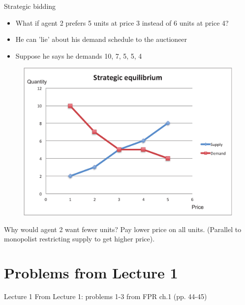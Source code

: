 \begin{frame}{Strategic bidding}
	\begin{itemize}
		\item What if agent 2 prefers 5 units at price 3 instead of 6 units at price 4?
		\item He can 'lie' about his demand schedule to the auctioneer
		\item Suppose he says he demands 10, 7, 5, 5, 4
	\end{itemize}
	\begin{figure}
		\includegraphics[width=.4\paperwidth]{pics/Image_Strategic2}
	\end{figure}
	Why would agent 2 want fewer units? Pay lower price on all units. (Parallel to monopolist restricting supply to get higher price). \hyperlink{main2}{}
\end{frame}



\section{Problems from Lecture 1}

\begin{frame}{Lecture 1}
	From Lecture 1: problems 1-3 from FPR ch.1 (pp. 44-45)
\end{frame}


